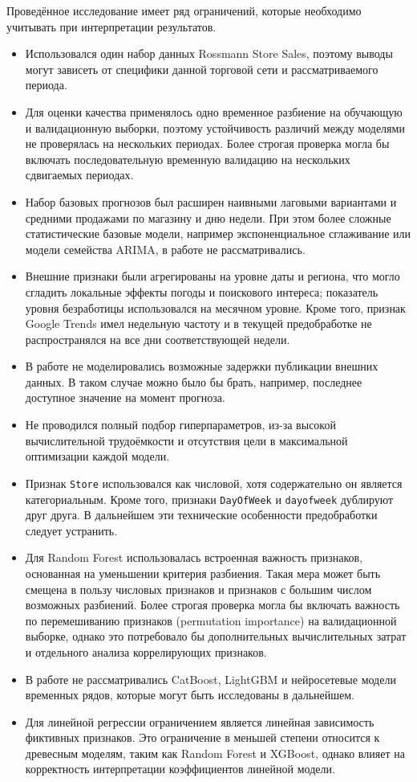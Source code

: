\documentclass[12pt,a4paper]{article}
\numberwithin{equation}{section}
\begin{document}
Проведённое исследование имеет ряд ограничений, которые необходимо учитывать при интерпретации результатов.

\begin{itemize}
    \item Использовался один набор данных Rossmann Store Sales, поэтому выводы могут зависеть от специфики данной торговой сети и рассматриваемого периода.
    \item Для оценки качества применялось одно временное разбиение на обучающую и валидационную выборки, поэтому устойчивость различий между моделями не проверялась на нескольких периодах. Более строгая проверка могла бы включать последовательную временную валидацию на нескольких сдвигаемых периодах.
    \item Набор базовых прогнозов был расширен наивными лаговыми вариантами и средними продажами по магазину и дню недели. При этом более сложные статистические базовые модели, например экспоненциальное сглаживание или модели семейства ARIMA, в работе не рассматривались.
    \item Внешние признаки были агрегированы на уровне даты и региона, что могло сгладить локальные эффекты погоды и поискового интереса; показатель уровня безработицы использовался на месячном уровне. Кроме того, признак Google Trends имел недельную частоту и в текущей предобработке не распространялся на все дни соответствующей недели.
    \item В работе не моделировались возможные задержки публикации внешних данных. В таком случае можно было бы брать, например, последнее доступное значение на момент прогноза.
    \item Не проводился полный подбор гиперпараметров, из-за высокой вычислительной трудоёмкости и отсутствия цели в максимальной оптимизации каждой модели.
    \item Признак \texttt{Store} использовался как числовой, хотя содержательно он является категориальным. Кроме того, признаки \texttt{DayOfWeek} и \texttt{dayofweek} дублируют друг друга. В дальнейшем эти технические особенности предобработки следует устранить.
    \item Для Random Forest использовалась встроенная важность признаков, основанная на уменьшении критерия разбиения. Такая мера может быть смещена в пользу числовых признаков и признаков с большим числом возможных разбиений. Более строгая проверка могла бы включать важность по перемешиванию признаков (permutation importance) на валидационной выборке, однако это потребовало бы дополнительных вычислительных затрат и отдельного анализа коррелирующих признаков.
    \item В работе не рассматривались CatBoost, LightGBM и нейросетевые модели временных рядов, которые могут быть исследованы в дальнейшем.
    \item Для линейной регрессии ограничением является линейная зависимость фиктивных признаков. Это ограничение в меньшей степени относится к древесным моделям, таким как Random Forest и XGBoost, однако влияет на корректность интерпретации коэффициентов линейной модели.
\end{itemize}
\end{document}
